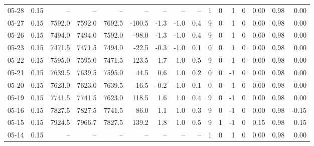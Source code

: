 \begin{threeparttable}
{\begin{tabular}{lrrrrrrrrrrrrrrr}
  05-28 &     0.15 &     -- &     -- &     -- &         -- &             -- &                       -- &                  -- &              1 &         0 &     1 &         0 &       0.00 &      0.98 &           0.00 \\
  05-27 &     0.15 & 7592.0 & 7592.0 & 7692.5 &     -100.5 &           -1.3 &                     -1.0 &                 0.4 &              9 &         0 &     1 &         0 &       0.00 &      0.98 &           0.00 \\
  05-26 &     0.15 & 7494.0 & 7494.0 & 7592.0 &      -98.0 &           -1.3 &                     -1.0 &                 0.4 &              9 &         0 &     1 &         0 &       0.00 &      0.98 &           0.00 \\
  05-23 &     0.15 & 7471.5 & 7471.5 & 7494.0 &      -22.5 &           -0.3 &                     -1.0 &                 0.1 &              0 &         0 &     1 &         0 &       0.00 &      0.98 &           0.00 \\
  05-22 &     0.15 & 7595.0 & 7595.0 & 7471.5 &      123.5 &            1.7 &                      1.0 &                 0.5 &              9 &         0 &    -1 &         0 &       0.00 &      0.98 &           0.00 \\
  05-21 &     0.15 & 7639.5 & 7639.5 & 7595.0 &       44.5 &            0.6 &                      1.0 &                 0.2 &              0 &         0 &    -1 &         0 &       0.00 &      0.98 &           0.00 \\
  05-20 &     0.15 & 7623.0 & 7623.0 & 7639.5 &      -16.5 &           -0.2 &                     -1.0 &                 0.1 &              0 &         0 &     1 &         0 &       0.00 &      0.98 &           0.00 \\
  05-19 &     0.15 & 7741.5 & 7741.5 & 7623.0 &      118.5 &            1.6 &                      1.0 &                 0.4 &              9 &         0 &    -1 &         0 &       0.00 &      0.98 &           0.00 \\
  05-16 &     0.15 & 7827.5 & 7827.5 & 7741.5 &       86.0 &            1.1 &                      1.0 &                 0.3 &              9 &         0 &    -1 &         0 &       0.00 &      0.98 &          -0.15 \\
  05-15 &     0.15 & 7924.5 & 7966.7 & 7827.5 &      139.2 &            1.8 &                      1.0 &                 0.5 &              9 &         1 &    -1 &         0 &       0.15 &      0.98 &           0.15 \\
  05-14 &     0.15 &     -- &     -- &     -- &         -- &             -- &                       -- &                  -- &              1 &         0 &     1 &         0 &       0.00 &      0.98 &           0.00 \\

\end{tabular}}
\end{threeparttable}

